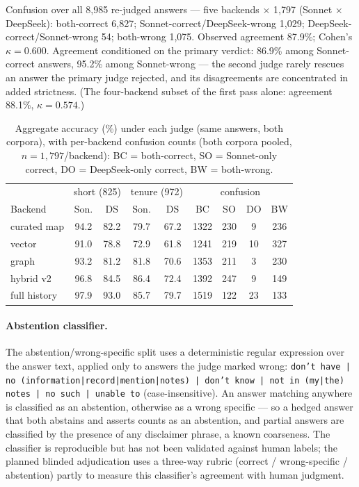 Confusion over all 8{,}985 re-judged answers --- five backends
$\times$ 1{,}797 (Sonnet $\times$ DeepSeek): both-correct 6{,}827;
Sonnet-correct/DeepSeek-wrong 1{,}029; DeepSeek-correct/Sonnet-wrong 54;
both-wrong 1{,}075. Observed agreement 87.9\%; Cohen's $\kappa=0.600$.
Agreement conditioned on the primary verdict: 86.9\% among Sonnet-correct
answers, 95.2\% among Sonnet-wrong --- the second judge rarely rescues an
answer the primary judge rejected, and its disagreements are concentrated
in added strictness. (The four-backend subset of the first pass alone:
agreement 88.1\%, $\kappa=0.574$.)

\begin{table}[h]
\centering
\small
\caption{Aggregate accuracy (\%) under each judge (same answers, both
corpora), with per-backend confusion counts (both corpora pooled,
$n{=}1{,}797$/backend): BC = both-correct, SO = Sonnet-only correct,
DO = DeepSeek-only correct, BW = both-wrong.}
\label{tab:crossjudgeagg}
\begin{tabular}{lcccccccc}
\toprule
 & \multicolumn{2}{c}{short (825)} & \multicolumn{2}{c}{tenure (972)} &
 \multicolumn{4}{c}{confusion} \\
Backend & Son. & DS & Son. & DS & BC & SO & DO & BW \\
\midrule
curated map  & 94.2 & 82.2 & 79.7 & 67.2 & 1322 & 230 &  9 & 236 \\
vector       & 91.0 & 78.8 & 72.9 & 61.8 & 1241 & 219 & 10 & 327 \\
graph        & 93.2 & 81.2 & 81.8 & 70.6 & 1353 & 211 &  3 & 230 \\
hybrid v2    & 96.8 & 84.5 & 86.4 & 72.4 & 1392 & 247 &  9 & 149 \\
full history & 97.9 & 93.0 & 85.7 & 79.7 & 1519 & 122 & 23 & 133 \\
\bottomrule
\end{tabular}
\end{table}

\paragraph{Abstention classifier.} The abstention/wrong-specific split
uses a deterministic regular expression over the answer text, applied only
to answers the judge marked wrong:
\texttt{don't have | no (information|record|mention|notes) | don't know |
not in (my|the) notes | no such | unable to} (case-insensitive). An answer
matching anywhere is classified as an abstention, otherwise as a wrong
specific --- so a hedged answer that both abstains and asserts counts as
an abstention, and partial answers are classified by the presence of any
disclaimer phrase, a known coarseness. The classifier is reproducible but
has not been validated against human labels; the planned blinded
adjudication uses a three-way rubric (correct / wrong-specific /
abstention) partly to measure this classifier's agreement with human
judgment.

